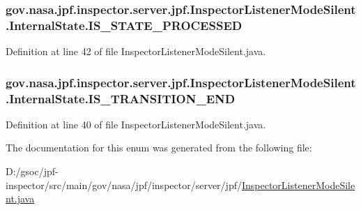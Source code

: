 \subsubsection[{\texorpdfstring{I\+S\+\_\+\+S\+T\+A\+T\+E\+\_\+\+P\+R\+O\+C\+E\+S\+S\+ED}{IS_STATE_PROCESSED}}]{\setlength{\rightskip}{0pt plus 5cm}gov.\+nasa.\+jpf.\+inspector.\+server.\+jpf.\+Inspector\+Listener\+Mode\+Silent.\+Internal\+State.\+I\+S\+\_\+\+S\+T\+A\+T\+E\+\_\+\+P\+R\+O\+C\+E\+S\+S\+ED}\hypertarget{enumgov_1_1nasa_1_1jpf_1_1inspector_1_1server_1_1jpf_1_1_inspector_listener_mode_silent_1_1_internal_state_a03d7763804ef0653ffd90b3973ffa83d}{}\label{enumgov_1_1nasa_1_1jpf_1_1inspector_1_1server_1_1jpf_1_1_inspector_listener_mode_silent_1_1_internal_state_a03d7763804ef0653ffd90b3973ffa83d}


Definition at line 42 of file Inspector\+Listener\+Mode\+Silent.\+java.

\subsubsection[{\texorpdfstring{I\+S\+\_\+\+T\+R\+A\+N\+S\+I\+T\+I\+O\+N\+\_\+\+E\+ND}{IS_TRANSITION_END}}]{\setlength{\rightskip}{0pt plus 5cm}gov.\+nasa.\+jpf.\+inspector.\+server.\+jpf.\+Inspector\+Listener\+Mode\+Silent.\+Internal\+State.\+I\+S\+\_\+\+T\+R\+A\+N\+S\+I\+T\+I\+O\+N\+\_\+\+E\+ND}\hypertarget{enumgov_1_1nasa_1_1jpf_1_1inspector_1_1server_1_1jpf_1_1_inspector_listener_mode_silent_1_1_internal_state_a90117a0f47367dbacbacfcaa4ee8f49b}{}\label{enumgov_1_1nasa_1_1jpf_1_1inspector_1_1server_1_1jpf_1_1_inspector_listener_mode_silent_1_1_internal_state_a90117a0f47367dbacbacfcaa4ee8f49b}


Definition at line 40 of file Inspector\+Listener\+Mode\+Silent.\+java.



The documentation for this enum was generated from the following file\+:\begin{DoxyCompactItemize}
\item 
D\+:/gsoc/jpf-\/inspector/src/main/gov/nasa/jpf/inspector/server/jpf/\hyperlink{_inspector_listener_mode_silent_8java}{Inspector\+Listener\+Mode\+Silent.\+java}\end{DoxyCompactItemize}

